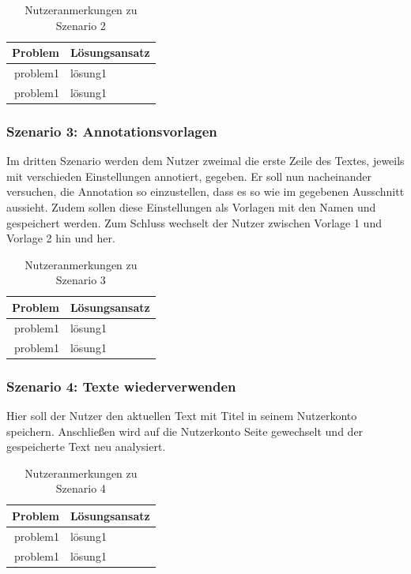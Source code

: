 
\begin{table}[h!]
	\centering
	\begin{tabular}{|r|l|}
		\hline
		\textbf{Problem} & \textbf{Lösungsansatz}\\
		\hline
		\hline
		problem1 & lösung1\\
		\hline
		problem1 & lösung1\\
		\hline
	\end{tabular}
	\caption{Nutzeranmerkungen zu Szenario 2}
	\label{table:szenario2}
\end{table}

\subsubsection{Szenario 3: Annotationsvorlagen}

Im dritten Szenario werden dem Nutzer zweimal die erste Zeile des Textes, jeweils mit verschieden Einstellungen annotiert, gegeben. Er soll nun nacheinander versuchen, die Annotation so einzustellen, dass es so wie im gegebenen Ausschnitt aussieht. Zudem sollen diese Einstellungen als Vorlagen mit den Namen  und  gespeichert werden. Zum Schluss wechselt der Nutzer zwischen Vorlage 1 und Vorlage 2 hin und her.

\begin{table}[h!]
	\centering
	\begin{tabular}{|r|l|}
		\hline
		\textbf{Problem} & \textbf{Lösungsansatz}\\
		\hline
		\hline
		problem1 & lösung1\\
		\hline
		problem1 & lösung1\\
		\hline
	\end{tabular}
	\caption{Nutzeranmerkungen zu Szenario 3}
	\label{table:szenario3}
\end{table}

\subsubsection{Szenario 4: Texte wiederverwenden}

Hier soll der Nutzer den aktuellen Text mit Titel in seinem Nutzerkonto speichern. Anschließen wird auf die Nutzerkonto Seite gewechselt und der gespeicherte Text neu analysiert.

\begin{table}[h!]
	\centering
	\begin{tabular}{|r|l|}
		\hline
		\textbf{Problem} & \textbf{Lösungsansatz}\\
		\hline
		\hline
		problem1 & lösung1\\
		\hline
		problem1 & lösung1\\
		\hline
	\end{tabular}
	\caption{Nutzeranmerkungen zu Szenario 4}
	\label{table:szenario4}
\end{table}

